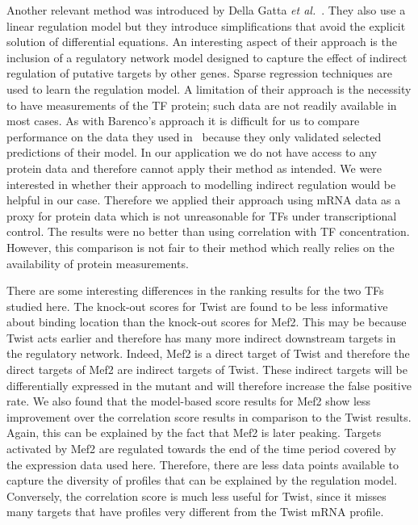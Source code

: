 \documentclass{pnastwo}
\begin{document}
\begin{article}
Another relevant method was introduced by Della Gatta {\em et
  al.}~\cite{Gatta2008}. They also use a linear regulation model but
they introduce simplifications that avoid the explicit solution of
differential equations. An interesting aspect of their approach is the
inclusion of a regulatory network model designed to capture the effect
of indirect regulation of putative targets by other genes. Sparse regression
techniques are used to learn the regulation model. A limitation of
their approach is the necessity to have measurements of the TF
protein; such data are not readily available in most cases. As with
Barenco's approach it is difficult for us to compare performance on
the data they used in~\cite{Gatta2008} because they only validated
selected predictions of their model. In our application we do not have
access to any protein data and therefore cannot apply their method as
intended. We were interested in whether
their approach to modelling indirect regulation would be helpful in
our case. Therefore we applied their approach using mRNA data as a
proxy for protein data which is not unreasonable for TFs under
transcriptional control. The results were no better than
using correlation with TF concentration. However, this comparison is
not fair to their method which really relies on the
availability of protein measurements.

There are some interesting differences in the ranking results for the two TFs studied
here. The knock-out scores for Twist are found to be less informative
about binding location than the knock-out scores for Mef2. This may be
because Twist acts earlier and therefore has many more indirect
downstream targets in the regulatory network. Indeed, Mef2 is a
direct target of Twist and therefore the direct targets of Mef2 are
indirect targets of Twist. These indirect targets will be
differentially expressed in the mutant and will therefore increase the
false positive rate. We also found that the model-based score results
for Mef2 show less improvement over the correlation score results in comparison to the Twist
results. Again, this can be explained by the fact that Mef2 is
later peaking. Targets activated by Mef2 are regulated towards the end of the
time period covered by the expression data used here. Therefore, there
are less data points available to capture the diversity of profiles
that can be explained by the regulation model. Conversely, the
correlation score is much less useful for Twist, since it misses many
targets that have profiles very different from the Twist mRNA
profile. 


\end{article}
\end{document}
